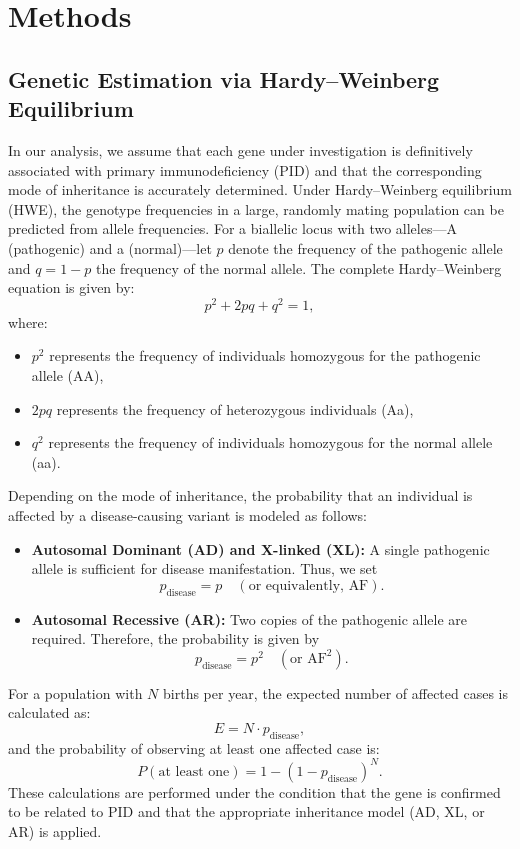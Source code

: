 \documentclass[a4paper,12pt]{article}
\begin{document}
\section{Methods}
\subsection{Genetic Estimation via Hardy–Weinberg Equilibrium}
In our analysis, we assume that each gene under investigation is definitively associated with primary immunodeficiency (PID) and that the corresponding mode of inheritance is accurately determined. Under Hardy–Weinberg equilibrium (HWE), the genotype frequencies in a large, randomly mating population can be predicted from allele frequencies. For a biallelic locus with two alleles—A (pathogenic) and a (normal)—let \(p\) denote the frequency of the pathogenic allele and \(q = 1-p\) the frequency of the normal allele. The complete Hardy–Weinberg equation is given by:
\[
p^2 + 2pq + q^2 = 1,
\]
where:
\begin{itemize}
    \item \(p^2\) represents the frequency of individuals homozygous for the pathogenic allele (AA),
    \item \(2pq\) represents the frequency of heterozygous individuals (Aa),
    \item \(q^2\) represents the frequency of individuals homozygous for the normal allele (aa).
\end{itemize}

Depending on the mode of inheritance, the probability that an individual is affected by a disease-causing variant is modeled as follows:
\begin{itemize}
    \item \textbf{Autosomal Dominant (AD) and X-linked (XL):} A single pathogenic allele is sufficient for disease manifestation. Thus, we set
    \[
    p_{\text{disease}} = p \quad (\text{or equivalently, } \text{AF}).
    \]
    \item \textbf{Autosomal Recessive (AR):} Two copies of the pathogenic allele are required. Therefore, the probability is given by
    \[
    p_{\text{disease}} = p^2 \quad (\text{or } \text{AF}^2).
    \]
\end{itemize}

For a population with \(N\) births per year, the expected number of affected cases is calculated as:
\[
E = N \cdot p_{\text{disease}},
\]
and the probability of observing at least one affected case is:
\[
P(\text{at least one}) = 1 - (1 - p_{\text{disease}})^N.
\]
These calculations are performed under the condition that the gene is confirmed to be related to PID and that the appropriate inheritance model (AD, XL, or AR) is applied.
\end{document}
